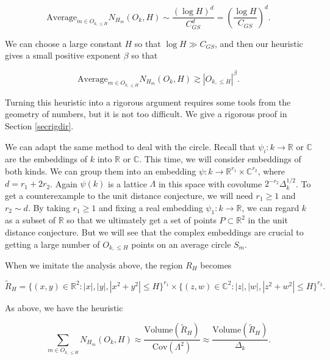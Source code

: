 \documentclass{amsart}
\newcommand{\CC}{\mathbb{C}}
\newcommand{\RR}{\mathbb{R}}
\newcommand{\heur}{\approx}
\newcommand{\Average}{\textrm{Average}}
\newcommand{\Volume}{\textrm{Volume}}
\newcommand{\Cov}{\textrm{Cov}}
\begin{document}
$$ \Average_{m \in O_{k, \le H} } N_{H_m}(O_k,H) \sim \frac{ (\log H)^d }{C_{GS}^d} = \left( \frac{ \log H}{C_{GS}} \right)^d. $$

\noindent We can choose a large constant $H$ so that $\log H \gg C_{GS}$,  and then our heuristic gives a small positive exponent $\beta$ so that 

$$ \Average_{m \in O_{k, \le H} } N_{H_m}(O_k,H) \gtrsim |O_{k, \le H}|^\beta. $$

Turning this heuristic into a rigorous argument requires some tools from the geometry of numbers,  but it is not too difficult.   We give a rigorous proof in Section \ref{secrigdir}.  

We can adapt the same method to deal with the circle.   Recall that $\psi_i: k \rightarrow \RR$ or $\CC$ are the embeddings of $k$ into $\RR$ or $\CC$.   This time,  we will consider embeddings of both kinds.   We can group them into an embedding $\psi: k \rightarrow \RR^{r_1} \times \CC^{r_2}$,  where $d = r_1 + 2 r_2$.   Again $\psi(k)$ is a lattice $\Lambda$ in this space with covolume $2^{-r_2} \Delta_k^{1/2}$.   To get a counterexample to the unit distance conjecture,  we will need $r_1 \ge 1$ and $r_2 \sim d$.   By taking $r_1 \ge 1$ and fixing a real embedding $\psi_1: k \rightarrow \RR$,  we can regard $k$ as a subset of $\RR$ so that we ultimately get a set of points $P \subset \RR^2$ in the unit distance conjecture.   But we will see that the complex embeddings are crucial to getting a large number of $O_{k, \le H}$ points on an average circle $S_m$.   

When we imitate the analysis above,  the region $R_H$ becomes

\begin{equation} \label{defRHt} \tilde R_H = \{ (x,y) \in \RR^2: |x|, |y|, |x^2 + y^2| \le H \}^{r_1} \times \{ (z,w) \in \CC^2: |z|, |w|,  |z^2 + w^2| \le H \}^{r_2}. \end{equation}

As above,  we have the heuristic

\begin{equation} \label{heurgn}
\sum_{m \in O_{k, \le H} } N_{H_m}(O_k, H) \heur \frac{ \Volume(\tilde R_H)} {\Cov(\Lambda^2)} \approx \frac{ \Volume(\tilde R_H)} {\Delta_k}. 
\end{equation}
\end{document}
